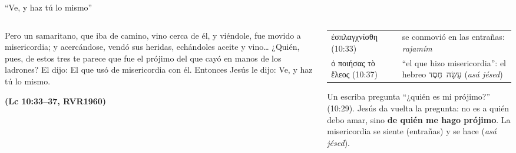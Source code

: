 \documentclass[hyperref={bookmarks=false},aspectratio=169]{beamer}
\newcommand{\heb}[1]{\mbox{\foreignlanguage{hebrew}{#1}}}
\newcommand{\grc}[1]{\foreignlanguage{ancientgreek}{#1}}
\newcommand{\fuente}[1]{\par\hfill{\upshape\bfseries\footnotesize\textcolor{azul}{#1}}}
\newcommand{\destacar}[1]{\textbf{\textcolor{azul}{#1}}}
\begin{document}
\begin{frame}{``Ve, y haz tú lo mismo''}
\begin{columns}[t,onlytextwidth]
\begin{column}{0.52\textwidth}
\begin{cita}Pero un samaritano, que iba de camino, vino cerca de él, y viéndole, fue movido a misericordia; y acercándose, vendó sus heridas, echándoles aceite y vino\ldots{} ¿Quién, pues, de estos tres te parece que fue el prójimo del que cayó en manos de los ladrones? El dijo: El que usó de misericordia con él. Entonces Jesús le dijo: Ve, y haz tú lo mismo.\fuente{(Lc 10:33--37, RVR1960)}\end{cita}
\end{column}
\begin{column}{0.46\textwidth}\scriptsize
\renewcommand{\arraystretch}{1.15}
\begin{tabular}{@{}>{\RaggedRight\arraybackslash}p{2.0cm}>{\RaggedRight\arraybackslash}p{3.3cm}@{}}
\toprule
\grc{ἐσπλαγχνίσθη} (10:33) & se conmovió en las entrañas: \emph{rajamím} \\
\grc{ὁ ποιήσας τὸ ἔλεος} (10:37) & ``el que hizo misericordia'': el hebreo \heb{עָשָׂה חֶסֶד} (\emph{asá jésed}) \\
\bottomrule
\end{tabular}\par\medskip
\small Un escriba pregunta ``¿quién es mi prójimo?'' (10:29). Jesús da vuelta la pregunta: no es a quién debo amar, sino \destacar{de quién me hago prójimo}. La misericordia se siente (entrañas) y se hace (\emph{asá jésed}).
\end{column}
\end{columns}
\end{frame}
\end{document}
